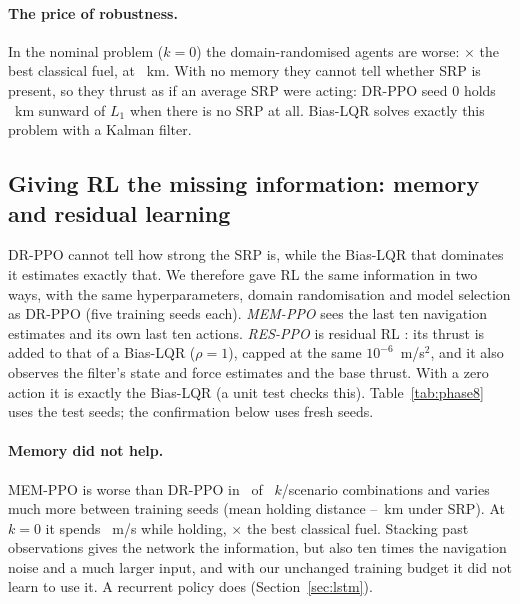 \documentclass[11pt,a4paper]{article}
\newcommand{\dv}{\Delta v}
\begin{document}
\paragraph{The price of robustness.}
In the nominal problem ($k = 0$) the domain-randomised agents are worse:
\mmDrRatioKzero$\times$ the best classical fuel, at \mmDrDistKzero~km. With no
memory they cannot tell whether SRP is present, so they thrust as if an
average SRP were acting: DR-PPO seed 0 holds \mmDrSunwardKzero~km sunward of
$L_1$ when there is no SRP at all. Bias-LQR solves exactly this problem with a
Kalman filter.

\subsection{Giving RL the missing information: memory and residual learning}
\label{sec:phase8}

DR-PPO cannot tell how strong the SRP is, while the Bias-LQR that dominates it
estimates exactly that. We therefore gave RL the same information in two ways,
with the same hyperparameters, domain randomisation and model selection as
DR-PPO (five training seeds each). \emph{MEM-PPO} sees the last ten navigation
estimates and its own last ten actions. \emph{RES-PPO} is residual RL
\cite{johannink2019,silver2018}: its thrust is added to that of a Bias-LQR
($\rho = 1$), capped at the same $10^{-6}$~m/s$^2$, and it also observes the
filter's state and force estimates and the base thrust. With a zero action it
is exactly the Bias-LQR (a unit test checks this). Table~\ref{tab:phase8} uses
the test seeds; the confirmation below uses fresh seeds.

\begin{table}[t]
\centering
\caption{Memory and residual RL, test seeds 100--119: $\dv$ divided by that of
the cheapest classical design (of \mmDesigns) that is at least as accurate,
mean $\pm$ std over 5 training seeds, and the number of RES-PPO seeds that no
classical design dominates.}
\label{tab:phase8}
\small

\end{table}

\paragraph{Memory did not help.} MEM-PPO is worse than DR-PPO in
\peMemWorseCases\ of \peMemCases\ $k$/scenario combinations and varies much more
between training seeds (mean holding distance \peMemDistMin--\peMemDistMax~km
under SRP). At $k = 0$ it spends \peMemHoldDvKzero~m/s while holding,
\peMemHoldRatioKzero$\times$ the best classical fuel. Stacking past
observations gives the network the information, but also ten times the
navigation noise and a much larger input, and with our unchanged training
budget it did not learn to use it. A recurrent policy does (Section~\ref{sec:lstm}).
\end{document}
